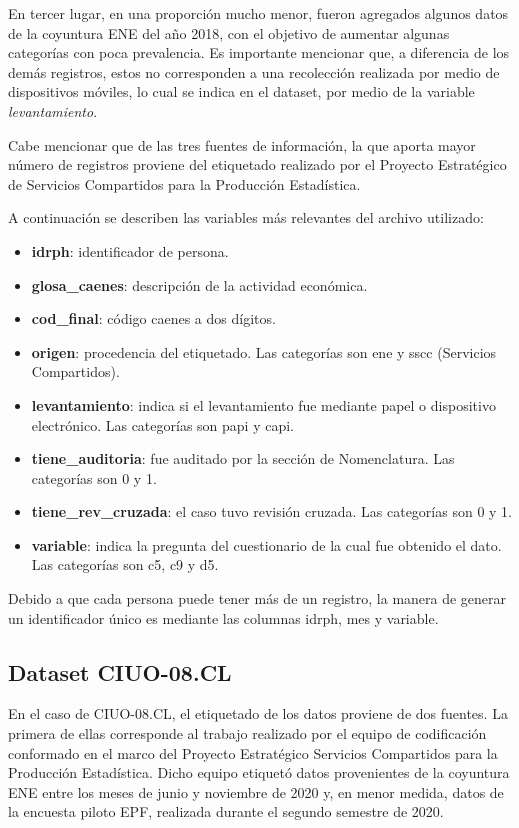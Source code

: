 \documentclass[
  12pt,
  spanish,
]{article}
\providecommand{\tightlist}{%
  \setlength{\itemsep}{0pt}\setlength{\parskip}{0pt}}
\begin{document}
En tercer lugar, en una proporción mucho menor, fueron agregados algunos
datos de la coyuntura ENE del año 2018, con el objetivo de aumentar
algunas categorías con poca prevalencia. Es importante mencionar que, a
diferencia de los demás registros, estos no corresponden a una
recolección realizada por medio de dispositivos móviles, lo cual se
indica en el dataset, por medio de la variable \emph{levantamiento}.

Cabe mencionar que de las tres fuentes de información, la que aporta
mayor número de registros proviene del etiquetado realizado por el
Proyecto Estratégico de Servicios Compartidos para la Producción
Estadística.

A continuación se describen las variables más relevantes del archivo
utilizado:

\begin{itemize}
\tightlist
\item
  \textbf{idrph}: identificador de persona.
\item
  \textbf{glosa\_caenes}: descripción de la actividad económica.
\item
  \textbf{cod\_final}: código caenes a dos dígitos.
\item
  \textbf{origen}: procedencia del etiquetado. Las categorías son ene y
  sscc (Servicios Compartidos).
\item
  \textbf{levantamiento}: indica si el levantamiento fue mediante papel
  o dispositivo electrónico. Las categorías son papi y capi.
\item
  \textbf{tiene\_auditoria}: fue auditado por la sección de
  Nomenclatura. Las categorías son 0 y 1.
\item
  \textbf{tiene\_rev\_cruzada}: el caso tuvo revisión cruzada. Las
  categorías son 0 y 1.
\item
  \textbf{variable}: indica la pregunta del cuestionario de la cual fue
  obtenido el dato. Las categorías son c5, c9 y d5.
\end{itemize}

Debido a que cada persona puede tener más de un registro, la manera de
generar un identificador único es mediante las columnas idrph, mes y
variable.

\hypertarget{dataset-ciuo-08.cl}{%
\subsection{Dataset CIUO-08.CL}\label{dataset-ciuo-08.cl}}

En el caso de CIUO-08.CL, el etiquetado de los datos proviene de dos
fuentes. La primera de ellas corresponde al trabajo realizado por el
equipo de codificación conformado en el marco del Proyecto Estratégico
Servicios Compartidos para la Producción Estadística. Dicho equipo
etiquetó datos provenientes de la coyuntura ENE entre los meses de junio
y noviembre de 2020 y, en menor medida, datos de la encuesta piloto EPF,
realizada durante el segundo semestre de 2020.
\end{document}
